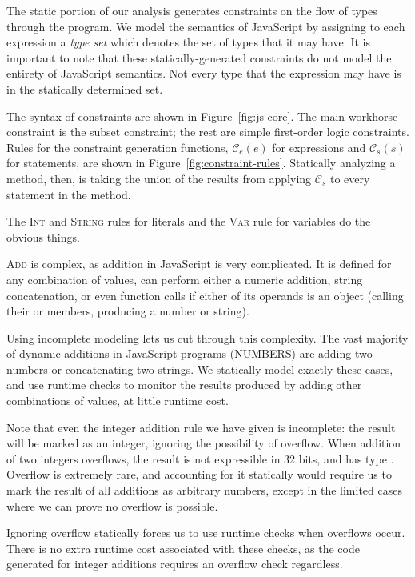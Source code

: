 The static portion of our analysis generates constraints on the flow of types
through the program. We model the semantics of JavaScript by assigning to each
expression a \emph{type set} which denotes the set of types that it may
have. It is important to note that these statically-generated constraints do
not model the entirety of JavaScript semantics. Not every type that the
expression may have is in the statically determined set.

The syntax of constraints are shown in Figure~\ref{fig:js-core}. The main
workhorse constraint is the subset constraint; the rest are simple first-order
logic constraints. Rules for the constraint generation functions,
$\mathcal{C}_e(e)$ for expressions and $\mathcal{C}_s(s)$ for statements, are
shown in Figure~\ref{fig:constraint-rules}. Statically analyzing a method,
then, is taking the union of the results from applying $\mathcal{C}_s$ to every
statement in the method.

The \textsc{Int} and \textsc{String} rules for literals and the \textsc{Var}
rule for variables do the obvious things.

\textsc{Add} is complex, as addition in JavaScript is very complicated. It is
defined for any combination of values, can perform either a numeric addition,
string concatenation, or even function calls if either of its operands is an
object (calling their  or  members, producing a
number or string).

Using incomplete modeling lets us cut through this complexity. The vast
majority of dynamic additions in JavaScript programs (NUMBERS) are adding two
numbers or concatenating two strings. We statically model exactly these cases,
and use runtime checks to monitor the results produced by adding other
combinations of values, at little runtime cost.

Note that even the integer addition rule we have given is incomplete: the
result will be marked as an integer, ignoring the possibility of
overflow. When addition of two integers overflows, the result is not
expressible in 32 bits, and has type . Overflow is extremely
rare, and accounting for it statically would require us to mark the result of
all additions as arbitrary numbers, except in the limited cases where we can
prove no overflow is possible.

Ignoring overflow statically forces us to use runtime checks when overflows
occur. There is no extra runtime cost associated with these checks, as the
code generated for integer additions requires an overflow check regardless.

